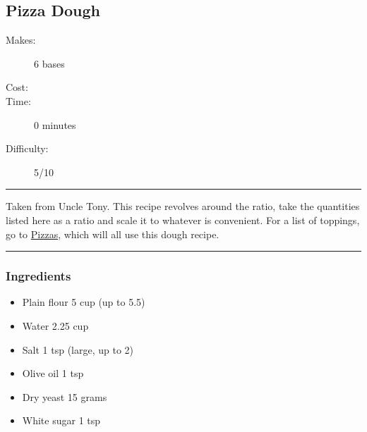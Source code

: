 \documentclass[]{article}
\begin{document}
\subsection*{\center\huge Pizza Dough}
\begin{description}
\item[Makes:] 6 bases
\item[Cost:] \textdollar
\item[Time:] 0 minutes
\item[Difficulty:] 5/10
\end{description}
\vspace{0.2cm}\hrule\vspace{0.5cm}
\begin{adjustwidth}{0.5 cm}{0.5 cm}

Taken from Uncle Tony. This recipe revolves around the ratio, take the quantities listed here as a ratio and scale it to whatever is convenient. For a list of toppings, go to \hyperref[cat:Pizzas]{Pizzas}, which will all use this dough recipe. \hfill\color{accent}{\Large\faVimeoSquare\hspace{0.1cm}\faTruck\hspace{0.1cm}}\color{black}

\end{adjustwidth}
\vspace{0.5cm}\hrule
\subsubsection*{\Large Ingredients}
\begin{multicols}{2}
\begin{itemize}
 \item Plain flour \hfill 5 cup (up to 5.5)
 \item Water \hfill 2.25 cup
 \item Salt \hfill 1 tsp (large, up to 2)
 \item Olive oil \hfill 1 tsp
 \item Dry yeast \hfill 15 grams
 \item White sugar \hfill 1 tsp
\end{itemize}
\end{multicols}
\end{document}
